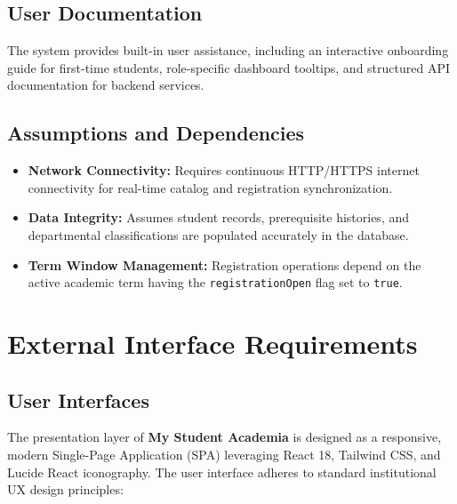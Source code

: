 \documentclass[a4paper,12pt]{article}
\begin{document}
\subsection{User Documentation}
The system provides built-in user assistance, including an interactive onboarding guide for first-time students, role-specific dashboard tooltips, and structured API documentation for backend services.

\subsection{Assumptions and Dependencies}
\begin{itemize}[leftmargin=1.2cm]
    \item \textbf{Network Connectivity:} Requires continuous HTTP/HTTPS internet connectivity for real-time catalog and registration synchronization.
    \item \textbf{Data Integrity:} Assumes student records, prerequisite histories, and departmental classifications are populated accurately in the database.
    \item \textbf{Term Window Management:} Registration operations depend on the active academic term having the \texttt{registrationOpen} flag set to \texttt{true}.
\end{itemize}

\newpage
\section{External Interface Requirements}

\subsection{User Interfaces}
The presentation layer of \textbf{My Student Academia} is designed as a responsive, modern Single-Page Application (SPA) leveraging React 18, Tailwind CSS, and Lucide React iconography. The user interface adheres to standard institutional UX design principles:
\end{document}
